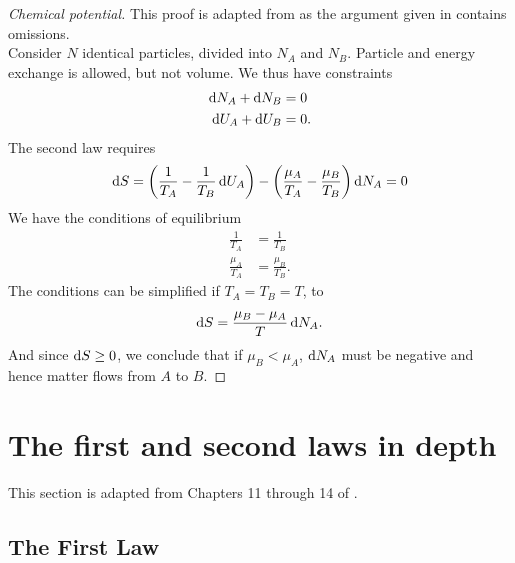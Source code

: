 \begin{proof}[Chemical potential]
This proof is adapted from \cite{callen} as the argument given in \cite{dill} contains omissions. \\
Consider $N$ identical particles, divided into $N_A$ and $N_B$. Particle and energy exchange is allowed, but not volume. We thus have constraints
\begin{subequations}
\begin{align}
\dif N_A+\dif N_B&=0 \\
\dif U_A+\dif U_B&=0.
\end{align}
\end{subequations}
The second law requires
\begin{equation}
\dif S=\left(\frac{1}{T_A}-\frac{1}{T_B}\dif U_A \right)-\left(\frac{\mu_A}{T_A}-\frac{\mu_B}{T_B} \right)\dif N_A=0
\end{equation}
We have the conditions of equilibrium
\begin{subequations}
\begin{align}
\frac{1}{T_A}&=\frac{1}{T_B}\\
\frac{\mu_A}{T_A}&=\frac{\mu_B}{T_B}.
\end{align}
\end{subequations}
The conditions can be simplified if $T_A=T_B=T$, to
\begin{equation}
\dif S=\frac{\mu_B-\mu_A}{T}\dif N_A. 
\end{equation}
And since $\dif S\geq0$, we conclude that if $\mu_B<\mu_A$, $\dif N_A$ must be negative and hence matter flows from $A$ to $B$.
\end{proof}

\section{The first and second laws in depth}
This section is adapted from Chapters 11 through 14 of \cite{bl}. 
\subsection{The First Law}
